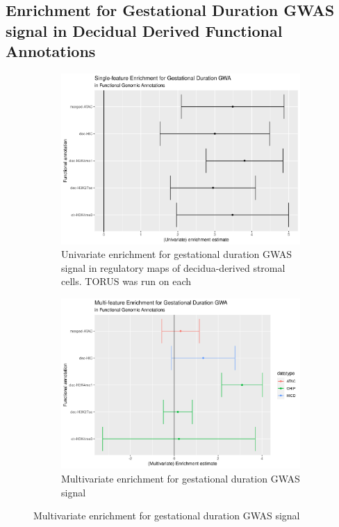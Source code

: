 \subsection{Enrichment for Gestational Duration GWAS signal in Decidual Derived Functional Annotations}

\begin{figure}
  \centering
  \begin{subfigure}[t]{\textwidth}
    \centering
    \includegraphics[width=\linewidth]{img/ptb_univ_assoc.png}
    \caption{Univariate enrichment for gestational duration GWAS signal in regulatory maps of decidua-derived stromal cells. TORUS was run on each }\label{fig:univ_assoc}
  \end{subfigure}
    \begin{subfigure}[t]{\textwidth}
    \centering
    \includegraphics[width=\linewidth]{img/ptb_multiv_assoc.png}
    \caption{Multivariate enrichment for gestational duration GWAS signal}\label{fig:multiv_assoc}
    \end{subfigure}
\end{figure}



